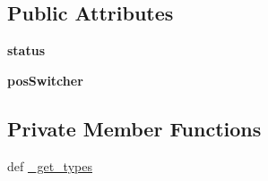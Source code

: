 \subsection*{\-Public \-Attributes}
\begin{DoxyCompactItemize}
\item 
\hypertarget{class_c_i_t_i_u_s___control___communication_1_1srv_1_1__srv__vehicle_status_1_1srv__vehicle_status_request_ae6e3da4a977df935fc2f8e79d9131175}{{\bfseries status}}\label{class_c_i_t_i_u_s___control___communication_1_1srv_1_1__srv__vehicle_status_1_1srv__vehicle_status_request_ae6e3da4a977df935fc2f8e79d9131175}

\item 
\hypertarget{class_c_i_t_i_u_s___control___communication_1_1srv_1_1__srv__vehicle_status_1_1srv__vehicle_status_request_a2a1e05714e10dc1df3187b9fe2e17c63}{{\bfseries pos\-Switcher}}\label{class_c_i_t_i_u_s___control___communication_1_1srv_1_1__srv__vehicle_status_1_1srv__vehicle_status_request_a2a1e05714e10dc1df3187b9fe2e17c63}

\end{DoxyCompactItemize}
\subsection*{\-Private \-Member \-Functions}
\begin{DoxyCompactItemize}
\item 
def \hyperlink{class_c_i_t_i_u_s___control___communication_1_1srv_1_1__srv__vehicle_status_1_1srv__vehicle_status_request_a7793022bfed55d30aeca9b7e0a75a9f9}{\-\_\-get\-\_\-types}
\end{DoxyCompactItemize}
